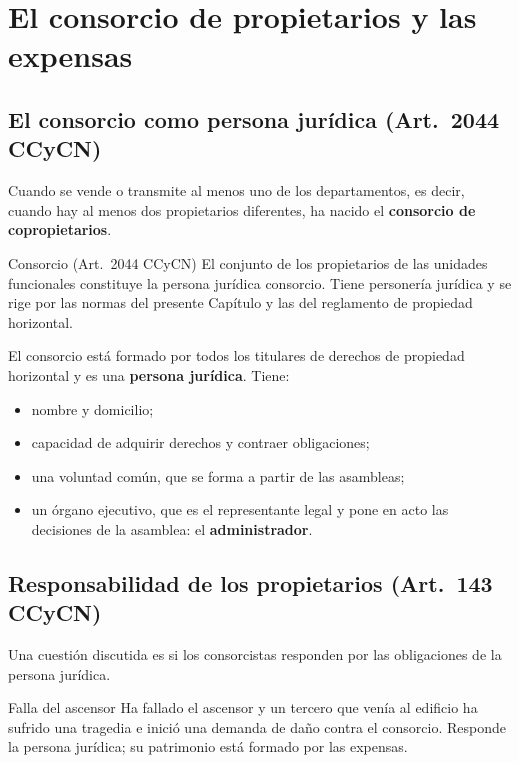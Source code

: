 \documentclass[12pt,oneside]{book}
\begin{document}
\chapter[El consorcio y las expensas]{El consorcio de propietarios y las expensas}

\section{El consorcio como persona jurídica (Art.~2044 CCyCN)}

Cuando se vende o transmite al menos uno de los departamentos, es decir, cuando hay al menos dos propietarios diferentes, ha nacido el \textbf{consorcio de copropietarios}.

\begin{definition}{Consorcio (Art.~2044 CCyCN)}
El conjunto de los propietarios de las unidades funcionales constituye la persona jurídica consorcio. Tiene personería jurídica y se rige por las normas del presente Capítulo y las del reglamento de propiedad horizontal.
\end{definition}

El consorcio está formado por todos los titulares de derechos de propiedad horizontal y es una \textbf{persona jurídica}. Tiene:

\begin{itemize}
    \item nombre y domicilio;
    \item capacidad de adquirir derechos y contraer obligaciones;
    \item una voluntad común, que se forma a partir de las asambleas;
    \item un órgano ejecutivo, que es el representante legal y pone en acto las decisiones de la asamblea: el \textbf{administrador}.
\end{itemize}

\section{Responsabilidad de los propietarios (Art.~143 CCyCN)}

Una cuestión discutida es si los consorcistas responden por las obligaciones de la persona jurídica.

\begin{example}{Falla del ascensor}
Ha fallado el ascensor y un tercero que venía al edificio ha sufrido una tragedia e inició una demanda de daño contra el consorcio. Responde la persona jurídica; su patrimonio está formado por las expensas.
\end{example}
\end{document}
